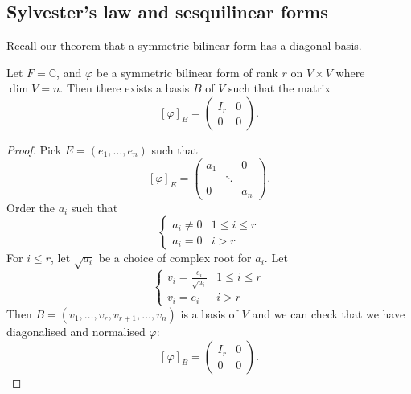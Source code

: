 \documentclass[a4paper]{scrartcl}
\begin{document}
\subsection{Sylvester's law and sesquilinear forms}
Recall our theorem that a symmetric bilinear form has a diagonal basis.

\begin{corollary}
    Let $F=\mathbb{C}$, and $\varphi$ be a symmetric bilinear form of rank $r$ on $V \times V$ where $\operatorname{dim}V=n$. Then there exists a basis $B$ of $V$ such that the matrix 
    \[[\varphi]_B=\left(
    \begin{array}{c|c}
     I_r &0\\
     \hline
     0&0
     \end{array}
     \right).\]
\end{corollary}
\begin{proof}
     Pick $E=(e_1, \ldots , e_n)$ such that 
     \[[\varphi]_E=
     \begin{pmatrix}
     a_1&&0\\ &\ddots&\\ 0&&a_n
     \end{pmatrix}
     .\]
     Order the $a_i$ such that 
     \begin{equation*}
          \begin{cases}
              a_i \neq 0 & 1 \leq i \leq r\\
              a_i=0 & i>r
          \end{cases}
     \end{equation*}
     For $i \leq r$, let $\sqrt{a_i}$ be a choice of complex root for $a_i$. Let 
     \begin{equation*}
        \begin{cases}
            v_i=\frac{e_i}{\sqrt{a_i}} & 1 \leq i \leq r\\
            v_i=e_i& i>r
        \end{cases}
   \end{equation*}
   Then $B= (v_1, \ldots ,v_r, v_{r+1}, \ldots , v_n)$ is a basis of $V$ and we can check that we have diagonalised and normalised $\varphi$:
   \[[\varphi]_B=\left(
     \begin{array}{c|c}
      I_r &0\\
      \hline
      0&0
      \end{array}
      \right).\]
\end{proof}
\end{document}
